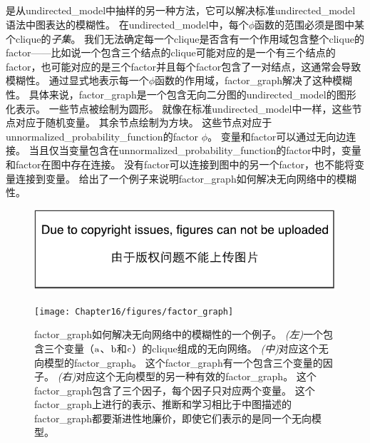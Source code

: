 \subsection{}
\label{sec:factor_graphs}



是从\gls{undirected_model}中抽样的另一种方法，它可以解决标准\gls{undirected_model}语法中图表达的模糊性。
在\gls{undirected_model}中，每个$\phi$函数的范围必须是图中某个\gls{clique}的\emph{子集}。
我们无法确定每一个\gls{clique}是否含有一个作用域包含整个\gls{clique}的\gls{factor}——比如说一个包含三个结点的\gls{clique}可能对应的是一个有三个结点的\gls{factor}，也可能对应的是三个\gls{factor}并且每个\gls{factor}包含了一对结点，这通常会导致模糊性。
通过显式地表示每一个$\phi$函数的作用域，\gls{factor_graph}解决了这种模糊性。
具体来说，\gls{factor_graph}是一个包含无向二分图的\gls{undirected_model}的图形化表示。
一些节点被绘制为圆形。 
就像在标准\gls{undirected_model}中一样，这些节点对应于随机变量。
其余节点绘制为方块。
这些节点对应于\gls{unnormalized_probability_function}的\gls{factor} $\phi$。
变量和\gls{factor}可以通过无向边连接。
当且仅当变量包含在\gls{unnormalized_probability_function}的\gls{factor}中时，变量和\gls{factor}在图中存在连接。
没有\gls{factor}可以连接到图中的另一个\gls{factor}，也不能将变量连接到变量。
给出了一个例子来说明\gls{factor_graph}如何解决无向网络中的模糊性。


\begin{figure}[!htb]
\ifOpenSource
\centerline{\includegraphics{figure.pdf}}
\else
	\centerline{\texttt{[image: Chapter16/figures/factor\_graph]}}	
\fi
\caption{\gls{factor_graph}如何解决无向网络中的模糊性的一个例子。
\emph{(左)}一个包含三个变量（$\mathrm{a}$、$\mathrm{b}$和$\mathrm{c}$）的\gls{clique}组成的无向网络。
\emph{(中)}对应这个无向模型的\gls{factor_graph}。
这个\gls{factor_graph}有一个包含三个变量的因子。
\emph{(右)}对应这个无向模型的另一种有效的\gls{factor_graph}。
这个\gls{factor_graph}包含了三个因子，每个因子只对应两个变量。
这个\gls{factor_graph}上进行的表示、推断和学习相比于中图描述的\gls{factor_graph}都要渐进性地廉价，即使它们表示的是同一个无向模型。}
	\label{fig:factor_graph}
\end{figure}


